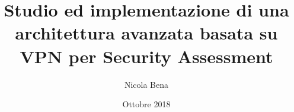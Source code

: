 \documentclass{beamer}
\title[]{Studio ed implementazione di una architettura avanzata basata su VPN per Security Assessment}
\author{Nicola Bena}
\date{Ottobre 2018}
\begin{document}
\frame{\titlepage}


\end{document}

